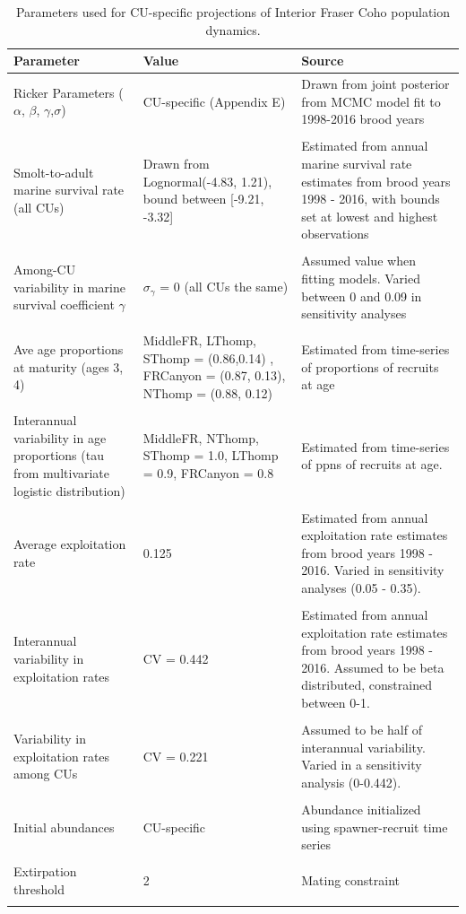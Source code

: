 \documentclass[11pt]{book}
\begin{document}
\begin{longtable}[]{p{3.7cm} p{5cm} p{6.3cm}}
\caption{Parameters used for CU-specific projections of Interior Fraser Coho population dynamics.}\\
\hline
Parameter & Value & Source \\ 
\hline
\endhead
\hline
 Ricker Parameters ($\alpha$, $\beta$, $\gamma$,$\sigma$)  &  CU-specific (Appendix E) & Drawn from joint posterior from MCMC model fit to 1998-2016 brood years
\\\\

Smolt-to-adult marine survival rate (all CUs) & Drawn from Lognormal(-4.83, 1.21), bound between [-9.21, -3.32]
 & Estimated from annual marine survival rate estimates from brood years 1998 - 2016, with bounds set at lowest and highest observations
\\\\  

 Among-CU variability in marine survival coefficient $\gamma$  &  $\sigma_{\gamma}$ = 0 (all CUs the same) & Assumed value when fitting models. Varied between 0 and 0.09 in sensitivity analyses
\\\\

 Ave age proportions at maturity (ages 3, 4) &  MiddleFR, LThomp, SThomp = (0.86,0.14) , FRCanyon = (0.87, 0.13), NThomp = (0.88, 0.12) & Estimated from time-series of proportions of recruits at age
 \\\\  

 Interannual variability in age proportions (tau from multivariate logistic distribution)  & MiddleFR, NThomp, SThomp = 1.0, LThomp = 0.9, FRCanyon = 0.8 & Estimated from time-series of ppns of recruits at age. \\\\

 Average exploitation rate & 0.125 & Estimated from annual exploitation rate estimates from brood years 1998 - 2016. Varied in sensitivity analyses (0.05 - 0.35).
 \\\\

Interannual variability in exploitation rates & CV = 0.442  & Estimated from annual exploitation rate estimates from brood years 1998 - 2016. Assumed to be beta distributed, constrained between 0-1.
\\\\

Variability in exploitation rates among CUs & CV = 0.221 & Assumed to be half of interannual variability. Varied in a sensitivity analysis (0-0.442).
\\\\ 

Initial abundances  & CU-specific & Abundance initialized using spawner-recruit time series
\\\\

Extirpation threshold &  2 & Mating constraint \\
\hline
\label{tab:coho-BaseProjectPars}
\end{longtable}
\end{document}
